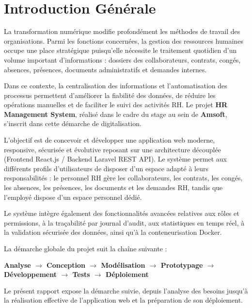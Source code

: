 \documentclass[12pt,a4paper]{report}
\begin{document}
\chapter*{Introduction Générale}

La transformation numérique modifie profondément les méthodes de travail des organisations. Parmi les fonctions concernées, la gestion des ressources humaines occupe une place stratégique puisqu'elle nécessite le traitement quotidien d'un volume important d'informations : dossiers des collaborateurs, contrats, congés, absences, présences, documents administratifs et demandes internes.

Dans ce contexte, la centralisation des informations et l'automatisation des processus permettent d'améliorer la fiabilité des données, de réduire les opérations manuelles et de faciliter le suivi des activités RH. Le projet \textbf{HR Management System}, réalisé dans le cadre du stage au sein de \textbf{Amsoft}, s'inscrit dans cette démarche de digitalisation.

L'objectif est de concevoir et développer une application web moderne, responsive, sécurisée et évolutive reposant sur une architecture découplée (Frontend React.js / Backend Laravel REST API). Le système permet aux différents profils d'utilisateurs de disposer d'un espace adapté à leurs responsabilités : le personnel RH gère les collaborateurs, les contrats, les congés, les absences, les présences, les documents et les demandes RH, tandis que l'employé dispose d'un espace personnel dédié.

Le système intègre également des fonctionnalités avancées relatives aux rôles et permissions, à la traçabilité par journal d'audit, aux statistiques en temps réel, à la validation sécurisée des données, ainsi qu'à la conteneurisation Docker.

La démarche globale du projet suit la chaîne suivante :
\begin{center}
    \textbf{Analyse $\rightarrow$ Conception $\rightarrow$ Modélisation $\rightarrow$ Prototypage $\rightarrow$ Développement $\rightarrow$ Tests $\rightarrow$ Déploiement}
\end{center}

Le présent rapport expose la démarche suivie, depuis l'analyse des besoins jusqu'à la réalisation effective de l'application web et la préparation de son déploiement.
\end{document}

